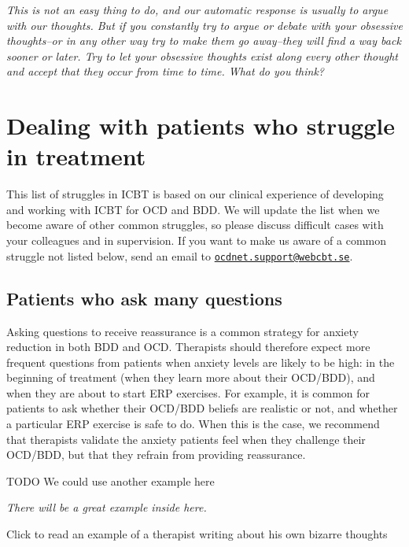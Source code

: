 \documentclass[]{book}
\theoremstyle{definition}
\theoremstyle{definition}
\theoremstyle{definition}
\theoremstyle{remark}
\begin{document}
\emph{This is not an easy thing to do, and our automatic response is
usually to argue with our thoughts. But if you constantly try to argue
or debate with your obsessive thoughts--or in any other way try to make
them go away--they will find a way back sooner or later. Try to let your
obsessive thoughts exist along every other thought and accept that they
occur from time to time. What do you think?}

\hypertarget{dealing-with-patients-who-struggle-in-treatment}{%
\section{Dealing with patients who struggle in
treatment}\label{dealing-with-patients-who-struggle-in-treatment}}

This list of struggles in ICBT is based on our clinical experience of
developing and working with ICBT for OCD and BDD. We will update the
list when we become aware of other common struggles, so please discuss
difficult cases with your colleagues and in supervision. If you want to
make us aware of a common struggle not listed below, send an email to
\href{mailto:ocdnet.support@webcbt.se}{\nolinkurl{ocdnet.support@webcbt.se}}.

\hypertarget{patients-who-ask-many-questions}{%
\subsection{Patients who ask many
questions}\label{patients-who-ask-many-questions}}

Asking questions to receive reassurance is a common strategy for anxiety
reduction in both BDD and OCD. Therapists should therefore expect more
frequent questions from patients when anxiety levels are likely to be
high: in the beginning of treatment (when they learn more about their
OCD/BDD), and when they are about to start ERP exercises. For example,
it is common for patients to ask whether their OCD/BDD beliefs are
realistic or not, and whether a particular ERP exercise is safe to do.
When this is the case, we recommend that therapists validate the anxiety
patients feel when they challenge their OCD/BDD, but that they refrain
from providing reassurance.

 TODO We could use another example here

\emph{There will be a great example inside here.}

 Click to read an example of a therapist writing about his own bizarre
thoughts
\end{document}

